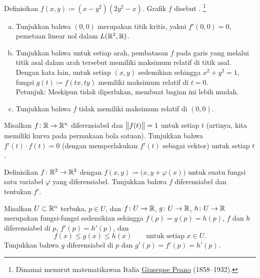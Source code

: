 \begin{exercise} \label{exercise:peano}
Definisikan $f(x,y) \coloneqq ( x-y^2 ) ( 2 y^2 - x)$.  Grafik $f$ disebut
\emph{}.%
\footnote{Dinamai menurut matematikawan Italia
\href{https://en.wikipedia.org/wiki/Giuseppe_Peano}{Giuseppe Peano}
(1858--1932).}
\begin{enumerate}[a)]
\item
Tunjukkan bahwa
$(0,0)$ merupakan titik kritis, yakni $f'(0,0) = 0$, pemetaan
linear nol dalam $L({\mathbb{R}}^2,{\mathbb{R}})$.
\item
Tunjukkan bahwa untuk setiap arah, pembatasan $f$ pada garis yang melalui titik asal
dalam arah tersebut memiliki maksimum relatif di titik asal.  Dengan kata lain,
untuk setiap $(x,y)$ sedemikian sehingga $x^2+y^2=1$, fungsi $g(t) \coloneqq f(tx,ty)$
memiliki maksimum relatif di $t=0$.\\
Petunjuk: Meskipun tidak diperlukan,
membuat
bagian ini lebih mudah.
\item
Tunjukkan bahwa $f$ tidak memiliki maksimum relatif di $(0,0)$.
\end{enumerate}
\end{exercise}

\begin{exercise}
Misalkan $f \colon {\mathbb{R}} \to {\mathbb{R}}^n$ diferensiabel dan $\bigl\lVert {f(t)} \bigr\rVert = 1$ untuk
setiap $t$ (artinya, kita memiliki kurva pada permukaan bola satuan).  Tunjukkan bahwa
$f'(t) \cdot f(t) = 0$ (dengan memperlakukan $f'(t)$ sebagai vektor) untuk setiap $t$.
\end{exercise}

\begin{exercise}
Definisikan $f \colon {\mathbb{R}}^2 \to {\mathbb{R}}^2$ dengan $f(x,y) \coloneqq
\bigl(x,y+\varphi(x)\bigr)$ untuk suatu fungsi satu variabel $\varphi$ yang
diferensiabel.  Tunjukkan bahwa $f$ diferensiabel dan tentukan $f'$.
\end{exercise}

\begin{exercise}
Misalkan $U \subset {\mathbb{R}}^n$ terbuka, $p \in U$, dan
$f \colon U \to {\mathbb{R}}$,
$g \colon U \to {\mathbb{R}}$,
$h \colon U \to {\mathbb{R}}$ merupakan fungsi-fungsi sedemikian sehingga
$f(p) = g(p) = h(p)$, $f$ dan $h$ diferensiabel di $p$,
$f'(p) = h'(p)$, dan
\begin{equation*}
f(x) \leq g(x) \leq h(x) \qquad \text{untuk setiap } x \in U .
\end{equation*}
Tunjukkan bahwa $g$ diferensiabel di $p$ dan
$g'(p) = f'(p) = h'(p)$.
\end{exercise}

